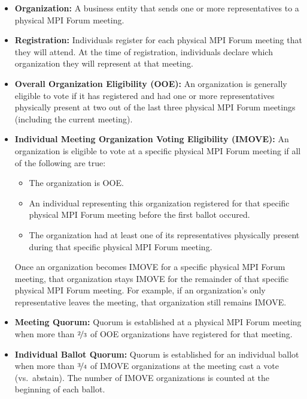 {{\begin{itemize}
\item {\bf Organization:} A business entity that sends one or more
  representatives to a physical MPI Forum meeting.

\item {\bf Registration:} Individuals register for each physical MPI
  Forum meeting that they will attend.  At the time of registration,
  individuals declare which organization they will represent at that
  meeting.

\item {\bf Overall Organization Eligibility (OOE):} An organization is
  generally eligible to vote if it has registered and had one or more
  representatives physically present at two out of the last three
  physical MPI Forum meetings (including the current meeting).

\item {\bf Individual Meeting Organization Voting Eligibility
    (IMOVE):} An organization is eligible to vote at a specific
  physical MPI Forum meeting if all of the following are true:
  \begin{itemize}
  \item The organization is OOE.
  \item An individual representing this organization registered for
    that specific physical MPI Forum meeting before the first ballot
    occured.
  \item The organization had at least one of its representatives
    physically present during that specific physical MPI
    Forum meeting.
  \end{itemize}
  Once an organization becomes IMOVE for a specific physical MPI Forum
  meeting, that organization stays IMOVE for the remainder of that
  specific physical MPI Forum meeting.  For example, if an
  organization's only representative leaves the meeting, that
  organization still remains IMOVE.

\item {\bf Meeting Quorum:} Quorum is established at a physical MPI
  Forum meeting when more than $\nicefrac{2}{3}$ of OOE organizations
  have registered for that meeting.

\item {\bf Individual Ballot Quorum:} Quorum is established for an
  individual ballot when more than $\nicefrac{3}{4}$ of IMOVE
  organizations at the meeting cast a vote (vs.\ abstain).  The number
  of IMOVE organizations is counted at the beginning of each ballot.
\end{itemize}


}} %
